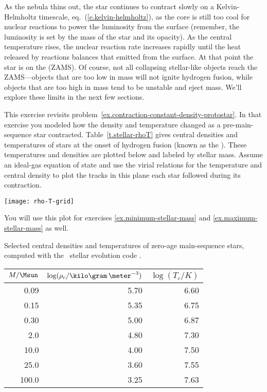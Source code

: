 As the nebula thins out, the star continues to contract slowly on a Kelvin-Helmholtz timescale, eq.~(\ref{e.kelvin-helmholtz}), as the core is still too cool for nuclear reactions to power the luminosity from the surface (remember, the luminosity is set by the mass of the star and its opacity). As the central temperature rises, the nuclear reaction rate increases rapidly until the heat released by reactions balances that emitted from the surface. At that point the star is on the  (ZAMS). Of course, not all collapsing stellar-like objects reach the ZAMS---objects that are too low in mass will not ignite hydrogen fusion, while objects that are too high in mass tend to be unstable and eject mass. We'll explore these limits in the next few sections.

\begin{exercisebox}
\label{ex.contraction-to-main-sequence}
This exercise revisits problem~\ref{ex.contraction-constant-density-protostar}. In that exercise you modeled how the density and temperature changed as a pre-main-sequence star contracted. Table~\ref{t.stellar-rhoT} gives central densities and temperatures of stars at the onset of hydrogen fusion (known as the ). These temperatures and densities are plotted below and labeled by stellar mass. Assume an ideal-gas equation of state and use the virial relations for the temperature and central density to plot the tracks in this plane each star followed during its contraction.
\begin{center}
\texttt{[image: rho-T-grid]}
\end{center}
You will use this plot for exercises \ref{ex.minimum-stellar-mass} and \ref{ex.maximum-stellar-mass} as well.
\end{exercisebox}

\begin{margintable}[-16\baselineskip]
\caption[Central densities and temperatures of zero-age main-sequence stars]{\label{t.stellar-rhoT}Selected central densities and temperatures of zero-age main-sequence stars, computed with the \mesa\ stellar evolution code \citep{Paxton2010Modules-for-Exp}.}
\begin{tabular}{rrr}
$M/\Msun$ & $\log(\rho_{c}/\kilo\gram\,\meter^{-3})$ & $\log(T_{c}/K)$\\
\hline
0.09 & 5.70 & 6.60\\
0.15 & 5.35 & 6.75\\
0.30 & 5.00 & 6.87\\
2.0 & 4.80 & 7.30\\
10.0 & 4.00 & 7.50\\
25.0 & 3.60 & 7.55\\
100.0 & 3.25 & 7.63\\
\end{tabular}
\end{margintable}

